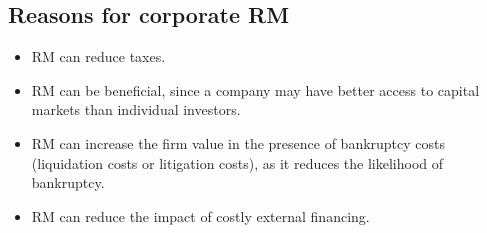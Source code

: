 \subsection*{Reasons for corporate RM}
\begin{itemize}[leftmargin=*]
    \item RM can reduce taxes.
    \item RM can be beneficial, since a company may have better access to capital markets than individual investors.
    \item RM can increase the firm value in the presence of bankruptcy costs (liquidation costs or litigation costs), as it reduces the likelihood of bankruptcy.
    \item RM can reduce the impact of costly external financing.
\end{itemize}